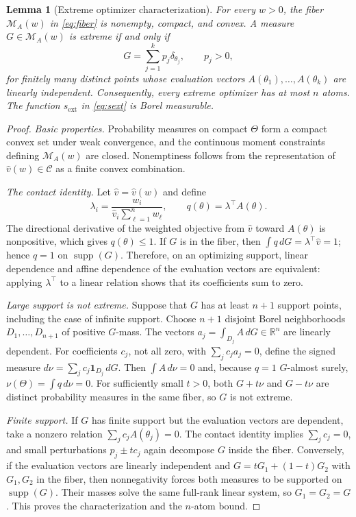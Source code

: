 \documentclass[11pt]{article}
\newtheorem{lemma}{Lemma}
\theoremstyle{definition}
\theoremstyle{remark}
\DeclareMathOperator{\supp}{supp}
\newcommand{\Mcal}{\mathcal M}
\newcommand{\Ccal}{\mathcal C}
\newcommand{\RR}{\mathbb R}
\newcommand{\vhat}{\widehat v}
\newcommand{\sext}{s_{\mathrm{ext}}}
\begin{document}
\begin{lemma}[Extreme optimizer characterization]
\label{lem:extreme}
For every $w>0$, the fiber $\Mcal_A(w)$ in \eqref{eq:fiber} is nonempty,
compact, and convex.  A measure $G\in\Mcal_A(w)$ is extreme if and only if
\[
 G=\sum_{j=1}^kp_j\delta_{\theta_j},\qquad p_j>0,
\]
for finitely many distinct points whose evaluation vectors
$A(\theta_1),\ldots,A(\theta_k)$ are linearly independent.  Consequently,
every extreme optimizer has at most $n$ atoms.  The function
$\sext$ in \eqref{eq:sext} is Borel measurable.
\end{lemma}

\begin{proof}
\emph{Basic properties.}  Probability measures on compact $\Theta$ form a
compact convex set under weak convergence, and the continuous moment
constraints defining $\Mcal_A(w)$ are closed.  Nonemptiness follows from the
representation of $\vhat(w)\in\Ccal$ as a finite convex combination.

\emph{The contact identity.}  Let $\widehat v=\vhat(w)$ and define
\[
 \lambda_i=\frac{w_i}{\widehat v_i\sum_{\ell=1}^nw_\ell},
 \qquad q(\theta)=\lambda^\top A(\theta).
\]
The directional derivative of the weighted objective from $\widehat v$ toward
$A(\theta)$ is nonpositive, which gives $q(\theta)\le1$.  If $G$ is in the
fiber, then $\int q\,dG=\lambda^\top\widehat v=1$; hence $q=1$ on
$\supp(G)$.  Therefore, on an optimizing support, linear dependence and
affine dependence of the evaluation vectors are equivalent: applying
$\lambda^\top$ to a linear relation shows that its coefficients sum to zero.

\emph{Large support is not extreme.}  Suppose that $G$ has at least $n+1$
support points, including the case of infinite support.  Choose $n+1$
disjoint Borel neighborhoods $D_1,\ldots,D_{n+1}$ of positive $G$-mass.  The
vectors $a_j=\int_{D_j}A\,dG\in\RR^n$ are linearly dependent.  For
coefficients $c_j$, not all zero, with $\sum_jc_ja_j=0$, define the signed
measure $d\nu=\sum_jc_j\bm 1_{D_j}\,dG$.  Then $\int A\,d\nu=0$ and, because
$q=1$ $G$-almost surely, $\nu(\Theta)=\int q\,d\nu=0$.  For sufficiently
small $t>0$, both $G+t\nu$ and $G-t\nu$ are distinct probability measures in
the same fiber, so $G$ is not extreme.

\emph{Finite support.}  If $G$ has finite support but the evaluation vectors
are dependent, take a nonzero relation $\sum_jc_jA(\theta_j)=0$.  The contact
identity implies $\sum_jc_j=0$, and small perturbations $p_j\pm tc_j$ again
decompose $G$ inside the fiber.  Conversely, if the evaluation vectors are
linearly independent and $G=tG_1+(1-t)G_2$ with $G_1,G_2$ in the fiber, then
nonnegativity forces both measures to be supported on $\supp(G)$.  Their
masses solve the same full-rank linear system, so $G_1=G_2=G$.  This proves
the characterization and the $n$-atom bound.


\end{proof}
\end{document}
